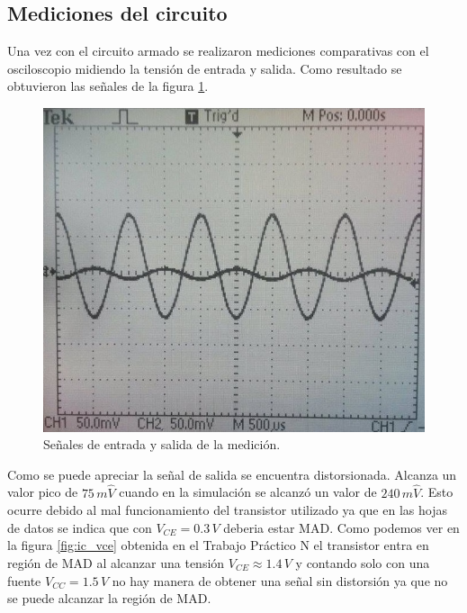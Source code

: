 \documentclass[10pt,spanish,a4paper,openany,notitlepage]{article}
\begin{document}
\subsection{Mediciones del circuito}

Una vez con el circuito armado se realizaron mediciones comparativas
con el osciloscopio midiendo la tensión de entrada y salida. Como
resultado se obtuvieron las señales de la figura \ref{fig:medicion_entrada_salida}.

\begin{figure}[H]
\centering
\includegraphics[scale=0.8]{./imagenes/experimental_entrada_salida.jpg}
\caption{Señales de entrada y salida de la medición.}
\label{fig:medicion_entrada_salida}
\end{figure}

Como se puede apreciar la señal de salida se encuentra distorsionada. Alcanza
un valor pico de $75\, \unit{m\widehat{V}}$ cuando en la simulación se
alcanzó un valor de $240\, \unit{m\widehat{V}}$. Esto ocurre debido
al mal funcionamiento del transistor utilizado ya que en las hojas de
datos se indica que con $V_{CE} = 0.3\, \unit{V}$ deberia estar MAD. 
Como podemos ver en la
figura \ref{fig:ic_vce} obtenida en el Trabajo Práctico N
el transistor entra en región de MAD al alcanzar una tensión 
$V_{CE} \approx 1.4\, \unit{V}$ y contando solo con una fuente $V_{CC} = 1.5\, \unit{V}$
no hay manera de obtener una señal sin distorsión ya que no se puede alcanzar
la región de MAD.
\end{document}
